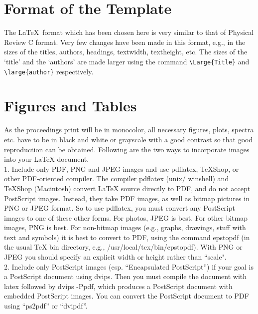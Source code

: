 \documentclass[twocolumn,amsmath,amssymb]{snp}
\begin{document}
\section*{Format of the Template}
The \LaTeX\ format which has been chosen here is very similar to that of Physical Review C format. Very few changes 
have been made in this format, e.g., in the sizes of the titles, authors, headings, textwidth, textheight, etc.
The sizes of the `title' and the `authors' are made larger using the command \verb+\Large{Title}+ and \verb+\large{author}+ respectively.


\section{Figures and Tables}
As the proceedings print will be in monocolor, all necessary figures, plots, spectra etc. have to be in 
black and white or grayscale with a good contrast so that good reproduction can be obtained. 
Following are the two ways to incorporate images into your LaTeX document.\\
1. Include only PDF, PNG and JPEG images and use pdflatex, TeXShop, or other PDF-oriented compiler. The compiler pdflatex (unix/ winshell)  and TeXShop (Macintosh) convert LaTeX source directly to PDF, and do not accept PostScript images. Instead, they take PDF images, as well as bitmap pictures in PNG or JPEG format. So to use pdflatex, you must convert any PostScript images to one of these other forms. For photos, JPEG is best. For other bitmap images, PNG is best. For non-bitmap
images (e.g., graphs, drawings, stuff with text and symbols) it is best to convert to PDF, using the command epstopdf (in the usual TeX bin directory, e.g., /usr/local/tex/bin/epstopdf). With PNG or JPEG you should specify an explicit width or height rather than ``scale".\\
2. Include only PostScript images (esp. ``Encapsulated PostScript'') if your
goal is a PostScript document using dvips. Then you must compile the document with latex followed by dvips -Ppdf, which
produces a PostScript document with embedded PostScript images. You can convert
the PostScript document to PDF using ``ps2pdf'' or ``dvipdf''.
\end{document}
